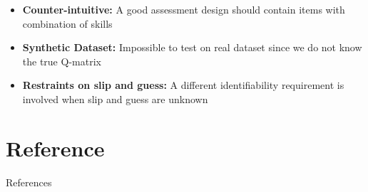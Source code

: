 \documentclass[handout]{beamer}
\begin{document}
\begin{frame}
	\begin{itemize}
		\item{\textbf{Counter-intuitive:}} A good assessment design should contain items with combination of skills
		\item{\textbf{Synthetic Dataset:}} Impossible to test on real dataset since we do not know the true Q-matrix
		\item{\textbf{Restraints on slip and guess:}} A different identifiability requirement is involved when slip and guess are unknown
	\end{itemize}
\end{frame}

\section[Reference]{Reference}
\begin{frame}{References}


\end{frame}
\end{document}
